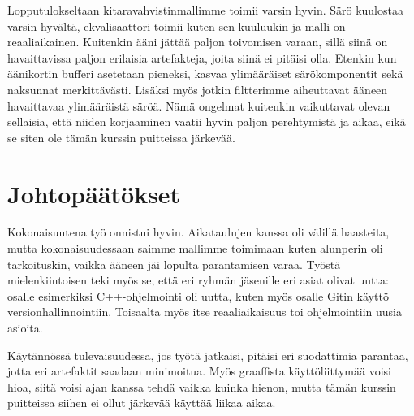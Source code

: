 \documentclass[11pt, a4paper, oneside]{article}
\begin{document}
Lopputulokseltaan kitaravahvistinmallimme toimii varsin hyvin. Särö kuulostaa varsin hyvältä, ekvalisaattori toimii kuten sen kuuluukin ja malli on reaaliaikainen. 
Kuitenkin ääni jättää paljon toivomisen varaan, sillä siinä on havaittavissa paljon erilaisia artefakteja, joita siinä ei pitäisi olla. 
Etenkin kun äänikortin bufferi asetetaan pieneksi, kasvaa ylimääräiset särökomponentit sekä naksunnat merkittävästi. 
Lisäksi myös jotkin filtterimme aiheuttavat ääneen havaittavaa ylimääräistä säröä.
Nämä ongelmat kuitenkin vaikuttavat olevan sellaisia, että niiden korjaaminen vaatii hyvin paljon perehtymistä ja aikaa, eikä se siten ole tämän kurssin puitteissa järkevää.


\section{Johtopäätökset}

Kokonaisuutena työ onnistui hyvin. 
Aikataulujen kanssa oli välillä haasteita, mutta kokonaisuudessaan saimme mallimme toimimaan kuten alunperin oli tarkoituskin, vaikka ääneen jäi lopulta parantamisen varaa.
Työstä mielenkiintoisen teki myös se, että eri ryhmän jäsenille eri asiat olivat uutta: osalle esimerkiksi C++-ohjelmointi oli uutta, kuten myös osalle Gitin käyttö versionhallinnointiin. 
Toisaalta myös itse reaaliaikaisuus toi ohjelmointiin uusia asioita.

Käytännössä tulevaisuudessa, jos työtä jatkaisi, pitäisi eri suodattimia parantaa, jotta eri artefaktit saadaan minimoitua.
Myös graaffista käyttöliittymää voisi hioa, siitä voisi ajan kanssa tehdä vaikka kuinka hienon, mutta tämän kurssin puitteissa siihen ei ollut järkevää käyttää liikaa aikaa.





\end{document}
